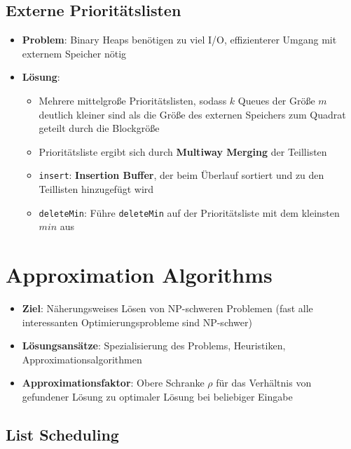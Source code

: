 \documentclass[10pt,a4paper]{article}
\begin{document}
	\subsection{Externe Prioritätslisten}
	\label{ea:sub:externe_prioritaetslisten}
	
	\begin{itemize}
		\item \textbf{Problem}: Binary Heaps benötigen zu viel I/O, effizienterer Umgang mit externem Speicher nötig
		\item \textbf{Lösung}:
		\begin{itemize}
			\item Mehrere mittelgroße Prioritätslisten, sodass $k$ Queues der Größe $m$ deutlich kleiner sind als die Größe des externen Speichers zum Quadrat geteilt durch die Blockgröße
			\item Prioritätsliste ergibt sich durch \textbf{Multiway Merging} der Teillisten
			\item \texttt{insert}: \textbf{Insertion Buffer}, der beim Überlauf sortiert und zu den Teillisten hinzugefügt wird
			\item \texttt{deleteMin}: Führe \texttt{deleteMin} auf der Prioritätsliste mit dem kleinsten $min$ aus
		\end{itemize}
	\end{itemize}

	\newpage
	\section{Approximation Algorithms}
	\label{aa:sec:approximation_algorithms}
	
	\begin{itemize}
		\item \textbf{Ziel}: Näherungsweises Lösen von NP-schweren Problemen (fast alle interessanten Optimierungsprobleme sind NP-schwer)
		\item \textbf{Lösungsansätze}: Spezialisierung des Problems, Heuristiken, Approximationsalgorithmen
		\item \textbf{Approximationsfaktor}: Obere Schranke $\rho$ für das Verhältnis von gefundener Lösung zu optimaler Lösung bei beliebiger Eingabe
	\end{itemize}

	\subsection{List Scheduling}
	\label{aa:sub:list_scheduling}
	
\end{document}
